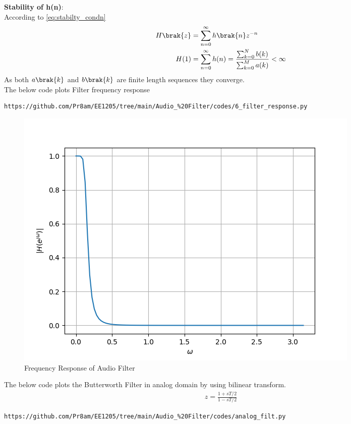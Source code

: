 \documentclass[journal,12pt,twocolumn]{IEEEtran}
\theoremstyle{remark}
\begin{document}
\begin{enumerate}[label=\thesection.\arabic*]
\textbf{Stability of h(n)}:\\
According to \eqref{eq:stabilty_condn}
\begin{align}
H\brak{z} &= \sum_{n = 0}^{\infty} h\brak{n}z^{-n}\\
H(1)&= \sum_{n = 0}^{\infty}h(n)  = \frac{\sum_{k = 0}^{N}b(k)}{\sum_{k = 0}^{M}a(k)}< \infty
\end{align}
As both $a\brak{k}$ and $b\brak{k}$ are finite length sequences they converge.\\
The below code plots Filter frequency response
\begin{lstlisting}
https://github.com/Pr8am/EE1205/tree/main/Audio_%20Filter/codes/6_filter_response.py
\end{lstlisting}
\begin{figure}[H]
\centering
\includegraphics[width=1\columnwidth]{figs/Filter_Response.png}
\caption{Frequency Response of Audio Filter}
\label{fig:H(w)_6}
\end{figure}
The below code plots the Butterworth Filter in analog domain by using bilinear transform.
\begin{align}
    z=\frac{1+sT/2}{1-sT/2}
\end{align}
\begin{lstlisting}
https://github.com/Pr8am/EE1205/tree/main/Audio_%20Filter/codes/analog_filt.py
\end{lstlisting}
\begin{figure}[H]
\centering

\end{figure}
\end{enumerate}
\end{document}
